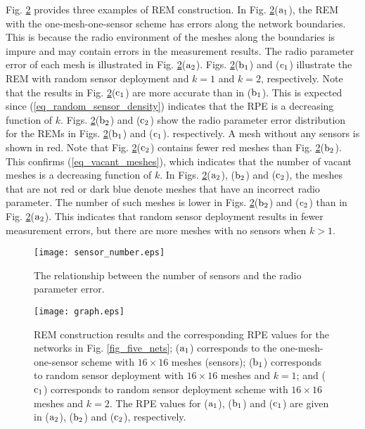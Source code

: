 \documentclass[conference]{IEEEtran}
\begin{document}
Fig. \ref{fig_picture_REM_construction} provides three examples of REM construction.
In Fig. \ref{fig_picture_REM_construction}($\rm{a_1}$), the REM with the one-mesh-one-sensor scheme has errors along the network boundaries.
This is because the radio environment of the meshes along the boundaries is impure and may contain errors in the measurement results.
The radio parameter error of each mesh is illustrated in Fig. \ref{fig_picture_REM_construction}($\rm{a_2}$).
Figs. \ref{fig_picture_REM_construction}($\rm{b_1}$) and ($\rm{c_1}$) illustrate the REM with random sensor deployment and $k=1$ and $k=2$, respectively.
Note that the results in Fig. \ref{fig_picture_REM_construction}($\rm{c_1}$) are more accurate than in ($\rm{b_1}$).
This is expected since (\ref{eq_random_sensor_density}) indicates that the RPE is a decreasing function of $k$.
Figs. \ref{fig_picture_REM_construction}($\rm{b_2}$) and ($\rm{c_2}$) show the radio parameter error distribution for the REMs in
Figs. \ref{fig_picture_REM_construction}($\rm{b_1}$) and ($\rm{c_1}$). respectively.
A mesh without any sensors is shown in red.
Note that Fig. \ref{fig_picture_REM_construction}($\rm{c_2}$) contains fewer red meshes than Fig. \ref{fig_picture_REM_construction}($\rm{b_2}$).
This confirms (\ref{eq_vacant_meshes}), which indicates that the number of vacant meshes is a decreasing function of $k$.
In Figs. \ref{fig_picture_REM_construction}($\rm{a_2}$), ($\rm{b_2}$) and ($\rm{c_2}$), the meshes that are not red or dark blue
denote meshes that have an incorrect radio parameter.
The number of such meshes is lower in Figs. \ref{fig_picture_REM_construction}($\rm{b_2}$) and ($\rm{c_2}$)
than in Fig. \ref{fig_picture_REM_construction}($\rm{a_2}$).
This indicates that random sensor deployment results in fewer measurement errors, but there are more meshes with no sensors when $k > 1$.

\begin{figure}[!t]
\centering
\texttt{[image: sensor\_number.eps]}
\caption{The relationship between the number of sensors and the radio parameter error.}
\label{fig_sensor_number}
\end{figure}

\begin{figure}
\centering
\texttt{[image: graph.eps]}
\caption{REM construction results and the corresponding RPE values for the networks in Fig. \ref{fig_five_nets};
($\rm{a_1}$) corresponds to the one-mesh-one-sensor scheme with $16 \times 16$ meshes (sensors);
($\rm{b_1}$) corresponds to random sensor deployment with $16 \times 16$ meshes and $k=1$;
and ($\rm{c_1}$) corresponds to random sensor deployment scheme with $16 \times 16$ meshes and $k=2$.
The RPE values for ($\rm{a_1}$), ($\rm{b_1}$) and ($\rm{c_1}$) are given in ($\rm{a_2}$), ($\rm{b_2}$) and ($\rm{c_2}$), respectively.} \label{fig_picture_REM_construction}
\end{figure}
\end{document}
